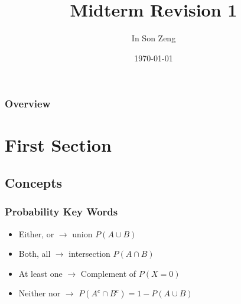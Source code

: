 \documentclass{beamer}
\title[Midterm Revision]{Midterm Revision 1} %
\author{In Son Zeng} %
\institute[University of Michigan] %
{
University of Michigan \\ %
\medskip
\textit{insonz@umich.edu} %
}
\date{\today} %
\begin{document}
\begin{frame}
\titlepage %
\end{frame}

\begin{frame}
\frametitle{Overview} %
\tableofcontents %
\end{frame}


\section{First Section} %

\subsection{Concepts} %

\begin{frame}
\frametitle{Probability Key Words}
\begin{itemize}
\item Either, or $\rightarrow$ union $P(A\cup B)$
\item Both, all $\rightarrow$ intersection $P(A\cap B)$
\item At least one $\rightarrow$ Complement of $P(X=0)$
\item Neither nor $\rightarrow$ $P(A^c \cap B^c) = 1 - P(A\cup B)$ 
\end{itemize}
\end{frame}
\end{document}
